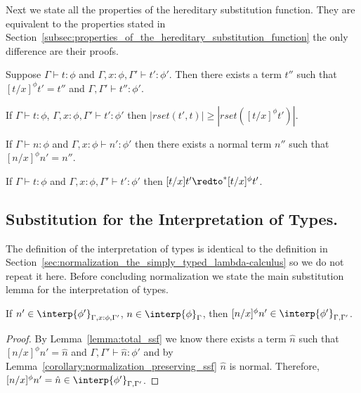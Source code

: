 \noindent Next we state all the properties of the hereditary
substitution function.  They are equivalent to the properties stated
in
Section~\ref{subsec:properties_of_the_hereditary_substitution_function}
the only difference are their proofs.
\begin{lemma}
  \label{lemma:total_ssf}
  Suppose $\Gamma \vdash t : \phi$ and $\Gamma, x:\phi, \Gamma' \vdash t':\phi'$. Then
  there exists a term $t''$ such that $[t/x]^\phi t' = t''$ and $\Gamma,\Gamma' \vdash t'':\phi'$.
\end{lemma}

\begin{lemma}
  \label{lemma:redex_preserving_ssf}
  If $\Gamma \vdash t : \phi$, $\Gamma, x:\phi, \Gamma' \vdash t':\phi'$ then
  $|rset(t', t)| \geq |rset([t/x]^\phi t')|$.
\end{lemma}

\begin{lemma}
  \label{corollary:normalization_preserving_ssf}
  If $\Gamma \vdash n:\phi$ and $\Gamma, x:\phi \vdash n':\phi'$ then there exists a normal term $n''$ 
  such that $[n/x]^\phi n' = n''$.
\end{lemma}

\begin{lemma}
  \label{lemma:soundness_reduction_ssf}
  If $\Gamma \vdash t : \phi$ and $\Gamma, x:\phi, \Gamma' \vdash t':\phi'$ then
  $[t/x]t' \redto^* [t/x]^\phi t'$.
\end{lemma}

\subsection{Substitution for the Interpretation of Types.}
\label{subsec:substitution_for_the_interpretation_of_types_ssf}
The definition of the interpretation of types is identical to the
definition in
Section~\ref{sec:normalization_the_simply_typed_lambda-calculus}
so we do not repeat it here.  Before concluding normalization we state
the main substitution lemma for the interpretation of types.
\begin{lemma}
  If $n' \in \interp{\phi'}_{\Gamma,x:\phi,\Gamma'}$, $n \in \interp{\phi}_\Gamma$, then 
  $[n/x]^\phi n' \in \interp{\phi'}_{\Gamma,\Gamma'}$.
  
  \label{lemma:interpretation_of_types_closed_substitution_ssf}
\end{lemma}
\begin{proof}
  By Lemma~\ref{lemma:total_ssf} we know there exists a term $\hat{n}$ 
  such that $[n/x]^\phi n' = \hat{n}$ and $\Gamma,\Gamma' \vdash \hat{n}:\phi'$ and by 
  Lemma~\ref{corollary:normalization_preserving_ssf} $\hat{n}$ is normal.  Therefore,
  $[n/x]^\phi n' = \hat{n} \in \interp{\phi'}_{\Gamma,\Gamma'}$.
\end{proof}

